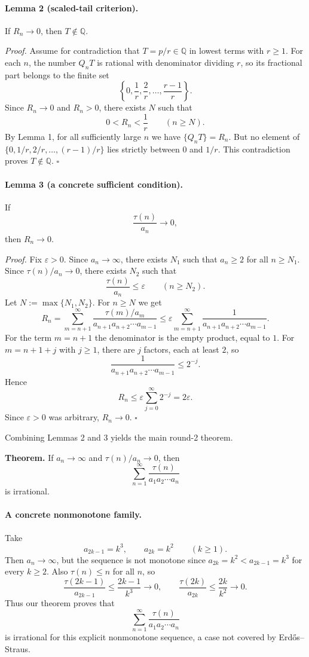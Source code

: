 \paragraph{Lemma 2 (scaled-tail criterion).}
If $R_n\to 0$, then $T\notin\mathbb{Q}$.

\emph{Proof.}
Assume for contradiction that $T=p/r\in\mathbb{Q}$ in lowest terms with $r\ge 1$. For each $n$, the number $Q_nT$ is rational with denominator dividing $r$, so its fractional part belongs to the finite set
\[
\left\{0,\frac1r,\frac2r,\dots,\frac{r-1}{r}\right\}.
\]
Since $R_n\to 0$ and $R_n>0$, there exists $N$ such that
\[
0<R_n<\frac1r\qquad (n\ge N).
\]
By Lemma 1, for all sufficiently large $n$ we have $\{Q_nT\}=R_n$. But no element of
\(
\{0,1/r,2/r,\dots,(r-1)/r\}
\)
lies strictly between $0$ and $1/r$. This contradiction proves $T\notin\mathbb{Q}$.
\hfill $\square$

\paragraph{Lemma 3 (a concrete sufficient condition).}
If
\[
\frac{\tau(n)}{a_n}\to 0,
\]
then $R_n\to 0$.

\emph{Proof.}
Fix $\varepsilon>0$. Since $a_n\to\infty$, there exists $N_1$ such that $a_n\ge 2$ for all $n\ge N_1$. Since $\tau(n)/a_n\to 0$, there exists $N_2$ such that
\[
\frac{\tau(n)}{a_n}\le \varepsilon\qquad (n\ge N_2).
\]
Let $N:=\max\{N_1,N_2\}$. For $n\ge N$ we get
\[
R_n
=\sum_{m=n+1}^{\infty}\frac{\tau(m)/a_m}{a_{n+1}a_{n+2}\cdots a_{m-1}}
\le \varepsilon\sum_{m=n+1}^{\infty}\frac{1}{a_{n+1}a_{n+2}\cdots a_{m-1}}.
\]
For the term $m=n+1$ the denominator is the empty product, equal to $1$. For $m=n+1+j$ with $j\ge 1$, there are $j$ factors, each at least $2$, so
\[
\frac{1}{a_{n+1}a_{n+2}\cdots a_{m-1}}\le 2^{-j}.
\]
Hence
\[
R_n\le \varepsilon\sum_{j=0}^{\infty}2^{-j}=2\varepsilon.
\]
Since $\varepsilon>0$ was arbitrary, $R_n\to 0$.
\hfill $\square$

Combining Lemmas 2 and 3 yields the main round-2 theorem.

\medskip
\noindent\textbf{Theorem.}
If $a_n\to\infty$ and $\tau(n)/a_n\to 0$, then
\[
\sum_{n=1}^{\infty}\frac{\tau(n)}{a_1a_2\cdots a_n}
\]
is irrational.

\paragraph{A concrete nonmonotone family.}
Take
\[
a_{2k-1}=k^3,
\qquad
 a_{2k}=k^2
\qquad (k\ge 1).
\]
Then $a_n\to\infty$, but the sequence is not monotone since $a_{2k}=k^2<a_{2k-1}=k^3$ for every $k\ge 2$. Also $\tau(n)\le n$ for all $n$, so
\[
\frac{\tau(2k-1)}{a_{2k-1}}\le \frac{2k-1}{k^3}\to 0,
\qquad
\frac{\tau(2k)}{a_{2k}}\le \frac{2k}{k^2}\to 0.
\]
Thus our theorem proves that
\[
\sum_{n=1}^{\infty}\frac{\tau(n)}{a_1a_2\cdots a_n}
\]
is irrational for this explicit nonmonotone sequence, a case not covered by Erd\H{o}s--Straus.

